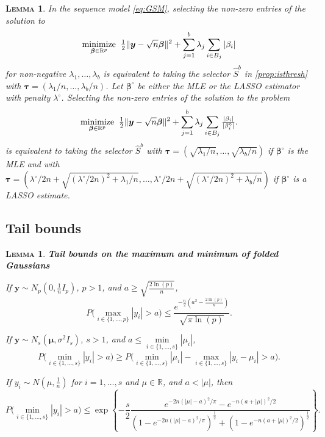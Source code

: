 \documentclass[aos]{imsart}
\theoremstyle{plain}
\newtheorem{lem}[thm]{\textsc{Lemma}}
\newcommand{\R}{\mathbb{R}}
\newcommand{\bs}{\boldsymbol}
\begin{document}
\begin{lem}\label{lem:l1isthreshold}
	In the sequence model \eqref{eq:GSM}, selecting the non-zero entries  of the solution to 
\begin{equation}\label{eq:genl1}
	\underset{\bs \beta \in \R^p}{\rm minimize} \;\;\tfrac12\|\bs y-\sqrt{n}\bs\beta\|^2+\sum_{j=1}^b \lambda_j \sum_{i \in B_j}|\beta_{i}|
\end{equation}
for non-negative $\lambda_1,\ldots,\lambda_b$  is equivalent to taking the selector $\hat S^{b}$ in \eqref{prop:isthresh} with $\bs \tau=(\lambda_1/n,\ldots,\lambda_b/n)$. Let $\bs\beta^\circ$ be either the MLE or the LASSO estimator with penalty $\lambda^\circ$. Selecting the non-zero entries of the solution to the problem
\begin{equation}\label{eq:genl1ada}
	\underset{\bs \beta \in \R^p}{\rm minimize} \;\;\tfrac12\|\bs y-\sqrt{n}\bs\beta\|^2+\sum_{j=1}^b \lambda_j \sum_{i \in B_j}\tfrac{|\beta_{i}|}{|\beta_i^\circ|}.
\end{equation}
is equivalent to taking the selector $\hat S^{b}$ with $\bs \tau=(\sqrt{\lambda_1/n},\ldots,\sqrt{\lambda_b/n})$ if $\bs\beta^\circ$ is the MLE and with $\bs \tau=(\lambda^\circ/2n+\sqrt{(\lambda^\circ/2n)^2+\lambda_1/n},\ldots,\lambda^\circ/2n+\sqrt{(\lambda^\circ/2n)^2+\lambda_b/n})$ if $\bs\beta^\circ$ is a LASSO estimate.
\end{lem}

\subsection{Tail bounds}

\begin{lem}\label{lemma:3tailbounds}\textbf{Tail bounds on the maximum and minimum of folded Gaussians} 
\begin{longlist}
        \item If $\bs y\sim N_p\left(0,\frac{1}{n}I_p \right)$, $p>1$, and $a \geq \sqrt{\frac{2\ln(p)}{n}}$, $$P\Big(\underset{i\in\{1,\ldots,p\}}{\max}|y_i|> a \Big) \leq \frac{e^{-\frac{n}{2}\left(a^2-\frac{2\ln (p)}{n}\right)}}{\sqrt{\pi\ln (p)}}.$$
    \item If $\bs y\sim N_s\left(\bs\mu,\sigma^2I_s\right)$, $s>1$, and $a \leq \underset{i\in\{1,\ldots,s\}}{\min}|\mu_i|$,
        $$P\Big(\underset{i\in\{1,\ldots,s\}}{\min}|y_i| > a\Big) \geq P\Big(\underset{i\in\{1,\ldots,s\}}{\min}|\mu_i|-\underset{i\in\{1,\ldots,s\}}{\max}|y_i-\mu_i| > a \Big).$$
    \item If $y_i\sim N\left(\mu,\frac{1}{n}\right)$ for $i=1,\ldots,s$ and $\mu \in \mathbb{R}$, and $a<|\mu|$, then
        $$P\Big(\underset{i\in\{1,\ldots,s\}}{\min}|y_i| > a \Big) \leq \exp\left\{-\frac{s}{2}\frac{e^{-2n(|\mu|-a)^2/\pi}-e^{-n(a+|\mu|)^2/2}}{\left(1-e^{-2n(|\mu|-a)^2/\pi}\right)^{\frac{1}{2}}+\left(1-e^{-n(a+|\mu|)^2/2}\right)^{\frac{1}{2}}}\right\}.$$
\end{longlist}
\end{lem}
\end{document}
